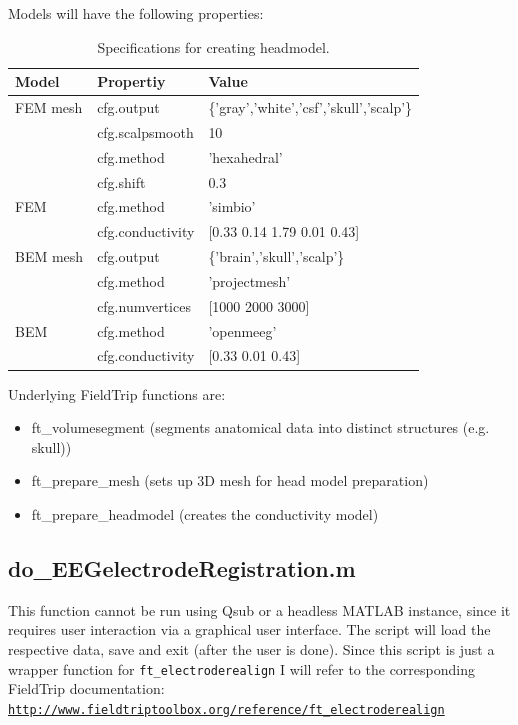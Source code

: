 \documentclass[12pt,a4paper]{scrartcl}
\begin{document}
Models will have the following properties:
\begin{table}[h]
\centering
\begin{tabular}{l | l | l}
\toprule
Model & Propertiy & Value\\\hline
  FEM mesh & cfg.output & \{'gray','white','csf','skull','scalp'\}\\\hline
   & cfg.scalpsmooth & 10\\\hline
   & cfg.method & 'hexahedral'\\\hline
   & cfg.shift & 0.3\\\hline
  FEM & cfg.method & 'simbio'\\\hline
   & cfg.conductivity & [0.33 0.14 1.79 0.01 0.43]\\\midrule
 BEM mesh & cfg.output & \{'brain','skull','scalp'\}\\\hline
  & cfg.method & 'projectmesh'\\\hline
  & cfg.numvertices & [1000 2000 3000]\\\hline
 BEM & cfg.method & 'openmeeg'\\\hline
  & cfg.conductivity & [0.33 0.01 0.43]\\\bottomrule
\end{tabular}
\caption[Specifications for creating headmodel]{Specifications for creating headmodel.}
\label{tab:BEMFEMprop}
\end{table}
Underlying FieldTrip functions are:
\begin{itemize}
\item ft\_volumesegment (segments anatomical data into distinct structures (e.g. skull))
\item ft\_prepare\_mesh (sets up 3D mesh for head model preparation)
\item ft\_prepare\_headmodel (creates the conductivity model)
\end{itemize}

\subsection{do\_EEGelectrodeRegistration.m}
\label{sec:elecReg}
This function cannot be run using Qsub or a headless MATLAB instance, since it requires user interaction via a graphical user interface. The script will load the respective data, save and exit (after the user is done). Since this script is just a wrapper function for \texttt{ft\_electroderealign} I will refer to the corresponding FieldTrip documentation: \href{http://www.fieldtriptoolbox.org/reference/ft\_electroderealign}{\nolinkurl{http://www.fieldtriptoolbox.org/reference/ft\_electroderealign}}
\end{document}
